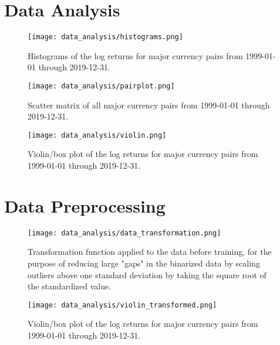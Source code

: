 \section{Data Analysis}
\begin{figure}
    \begin{center}
        \texttt{[image: data\_analysis/histograms.png]}
    \end{center}
    \caption{Histograms of the log returns for major currency pairs from 1999-01-01 through 2019-12-31.}
    \label{fig:histograms_raw}
\end{figure}

\begin{figure}
    \begin{center}
        \texttt{[image: data\_analysis/pairplot.png]}
    \end{center}
    \caption{Scatter matrix of all major currency pairs from 1999-01-01 through 2019-12-31.}
    \label{fig:pairplot}
\end{figure}

\begin{figure}
    \begin{center}
        \texttt{[image: data\_analysis/violin.png]}
    \end{center}
    \caption{Violin/box plot of the log returns for major currency pairs from 1999-01-01 through 2019-12-31.}
    \label{fig:violin_raw}
\end{figure}

\section{Data Preprocessing}


\begin{figure}
    \begin{center}
        \texttt{[image: data\_analysis/data\_transformation.png]}
    \end{center}
    \caption{Transformation function applied to the data before training, for the purpose of reducing large "gaps" in the binarized data by scaling outliers above one standard deviation by taking the square root of the standardized value.}
    \label{fig:data_transformation}
\end{figure}

\begin{figure}
    \begin{center}
        \texttt{[image: data\_analysis/violin\_transformed.png]}
    \end{center}
    \caption{Violin/box plot of the log returns for major currency pairs from 1999-01-01 through 2019-12-31.}
    \label{fig:violin_transformed}
\end{figure}

